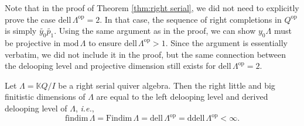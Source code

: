\documentclass[10pt,a4paper]{amsart}
\newcommand{\Findim}{\mathrm{Findim}\,}
\newcommand{\ddell}{\mathrm{ddell}\,}
\newcommand{\dell}{\mathrm{dell}\,}
\newcommand{\findim}{\mathrm{findim}\,}
\newcommand{\op}{\mathrm{op}}
\renewcommand{\k}{\mathbb{K}}
\renewcommand{\mod}{\mathrm{mod}\,}
\begin{document}
\begin{remark}
\label{rmk:dell=2 case}
Note that in the proof of Theorem \ref{thm:right serial}, we did not need to explicitly prove the case $\dell\Lambda^{\op}=2$. In that case, the sequence of right completions in $Q^{\op}$ is simply $\widetilde{y_0}\widetilde{p_1}$. Using the same argument as in the proof, we can show $y_0\Lambda$ must be projective in $\mod\Lambda$ to ensure $\dell\Lambda^{\op} > 1$. Since the argument is essentially verbatim, we did not include it in the proof, but the same connection between the delooping level and projective dimension still exists for $\dell\Lambda^{\op}=2$.
\end{remark}

\begin{theorem}
\label{thm:right serial}
Let $\Lambda=\k Q/I$ be a right serial quiver algebra. Then the right little and big finitistic dimensions of $\Lambda$ are equal to the left delooping level and derived delooping level of $\Lambda$, \textit{i.e.},
\[
\findim\Lambda = \Findim\Lambda = \dell\Lambda^{\op} = \ddell\Lambda^{\op} < \infty.
\]
\end{theorem}
\end{document}
